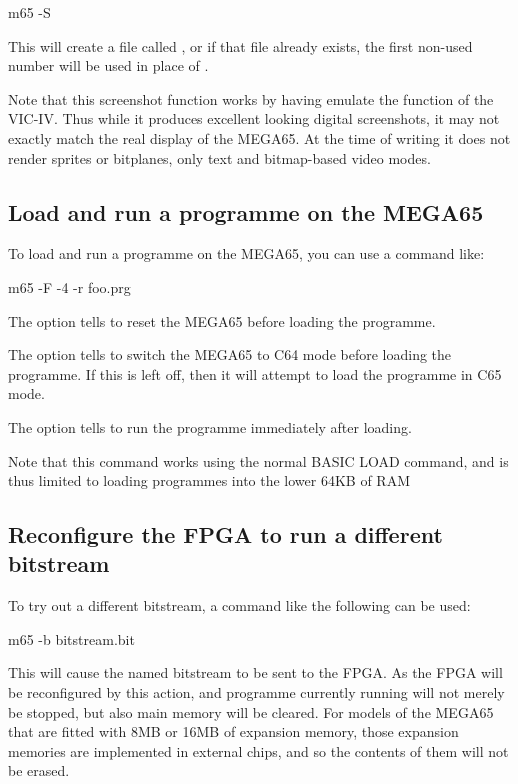 \begin{screenoutput}
m65 -S
\end{screenoutput}

This will create a file called ,
or if that file already exists, the first non-used number will be used
in place of .

Note that this screenshot function works by having  emulate the
function of the VIC-IV. Thus while it produces excellent looking
digital screenshots, it may not exactly match the real display of the
MEGA65.  At the time of writing it does not render sprites or
bitplanes, only text and bitmap-based video modes.

\subsection{Load and run a programme on the MEGA65}

To load and run a programme on the MEGA65, you can use a command like:

\begin{screenoutput}
m65 -F -4 -r foo.prg
\end{screenoutput}

The  option tells  to reset the MEGA65
before loading the programme.

The  option tells  to switch the MEGA65
to C64 mode before loading the programme. If this is left off, then it
will attempt to load the programme in C65 mode.

The  option tells  to run the programme
immediately after loading.

Note that this command works using the normal BASIC LOAD command, and
is thus limited to loading programmes into the lower 64KB of RAM

\subsection{Reconfigure the FPGA to run a different bitstream}

To try out a different bitstream, a command like the following can be
used:

\begin{screenoutput}
m65 -b bitstream.bit
\end{screenoutput}

This will cause the named bitstream to be sent to the FPGA.  As the
FPGA will be reconfigured by this action, and programme currently
running will not merely be stopped, but also main memory will be
cleared. For models of the MEGA65 that are fitted with 8MB or 16MB of
expansion memory, those expansion memories are implemented in external
chips, and so the contents of them will not be erased.

